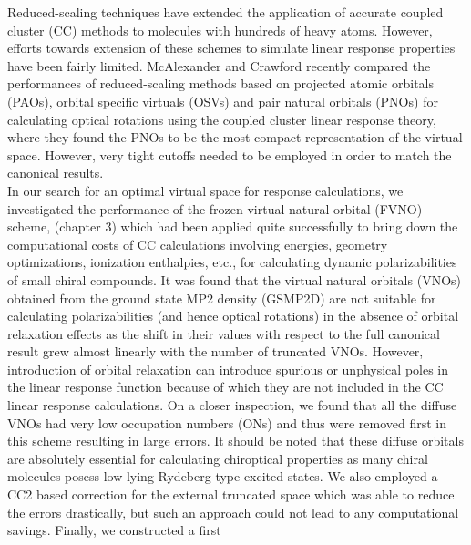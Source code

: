 Reduced-scaling techniques have extended the application of accurate coupled cluster (CC)
methods to molecules with hundreds of heavy atoms\cite{Neese09,NeeseCCSD09}. However, efforts towards extension 
of these schemes to simulate linear response properties have been fairly 
limited\cite{Gauss00,Korona04,Russ04,McAlexander12,Friedrich15,Russ08}. McAlexander and Crawford\cite{McAlexander15:LRCC} recently compared the performances of
reduced-scaling methods based on projected atomic orbitals (PAOs)\cite{Saebo86,Pulay83,PulaySaebo93}, orbital specific virtuals (OSVs)\cite{Yang12} and pair natural orbitals (PNOs)\cite{Edmiston66,Meyer73,Ahlrichs75,Neese09} for calculating optical rotations using the
coupled cluster linear response theory\cite{Koch90}, where they found the PNOs to be the most compact 
representation of the virtual space. However, very tight cutoffs needed to be employed in order to 
match the canonical results. \\
In our search for an optimal virtual space for response calculations,
we investigated the performance of the frozen virtual natural orbital (FVNO) scheme,
(chapter 3) which had been applied quite successfully to bring down the 
computational costs of CC calculations involving energies, geometry optimizations, 
ionization enthalpies, etc.\cite{Sosa89,Taube05,Taube08,Landau10,DePrince13:FNOs,DePrince13}, 
for calculating dynamic polarizabilities of 
small chiral compounds\cite{Kumar17}. It was found that the virtual natural orbitals (VNOs)
obtained from the ground state MP2 density (GSMP2D) are not suitable for calculating 
polarizabilities (and hence optical rotations) in the absence of orbital relaxation 
effects as the shift in their values with respect to the full canonical result grew 
almost linearly with the number of truncated VNOs. However, introduction of orbital
relaxation can introduce spurious or unphysical poles in the linear response function
because of which they are not included in the CC linear response calculations.
On a closer inspection, we found that all the diffuse 
VNOs had very low occupation numbers (ONs) and thus were removed first
in this scheme resulting in large errors. It should be noted that these 
diffuse orbitals are absolutely essential for calculating chiroptical properties 
as many chiral molecules posess low lying Rydeberg type excited states.
We also employed a CC2\cite{Christiansen95:CC2} based correction for the external truncated 
space which was able to reduce the errors drastically, but such an approach 
could not lead to any computational savings. Finally, we constructed a first 

